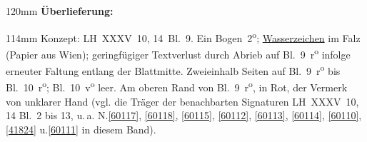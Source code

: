 \begin{ledgroupsized}[r]{120mm}
\footnotesize
\pstart
\noindent\textbf{Überlieferung:}
\pend
\end{ledgroupsized}
\begin{ledgroupsized}[r]{114mm}
\footnotesize
\pstart
\parindent -6mm
%
Konzept:
LH~XXXV~10, 14~Bl.~9. 
Ein Bogen~2\textsuperscript{o};
\href{\Scan{LH_35_10_14_009wz}}%
{Wasserzeichen} im Falz (Papier aus Wien);
geringfügiger Textverlust durch Abrieb auf Bl.~9~r\textsuperscript{o} infolge erneuter Faltung entlang der Blattmitte.
Zweieinhalb Seiten auf Bl.~9~r\textsuperscript{o} bis Bl.~10~r\textsuperscript{o};
Bl.~10~v\textsuperscript{o} leer.
Am oberen Rand von Bl.~9~r\textsuperscript{o}, in Rot, der Vermerk von unklarer Hand  (vgl. die Träger der benachbarten Signaturen LH~XXXV~10, 14 Bl.~2 bis 13, u.\,a. 
N.\;\ref{60117},
\ref{60118},
\ref{60115},
\ref{60112},
\ref{60113},
\ref{60114},
\ref{60110},
\ref{41824}
u.\;\ref{60111}
in diesem Band).
\pend
\end{ledgroupsized}
\vspace{5mm}
